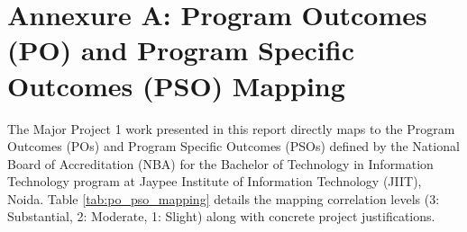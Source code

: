 \chapter*{Annexure A: Program Outcomes (PO) and Program Specific Outcomes (PSO) Mapping}
\label{annex:po_pso}

The Major Project 1 work presented in this report directly maps to the Program Outcomes (POs) and Program Specific Outcomes (PSOs) defined by the National Board of Accreditation (NBA) for the Bachelor of Technology in Information Technology program at Jaypee Institute of Information Technology (JIIT), Noida. Table \ref{tab:po_pso_mapping} details the mapping correlation levels (3: Substantial, 2: Moderate, 1: Slight) along with concrete project justifications.


